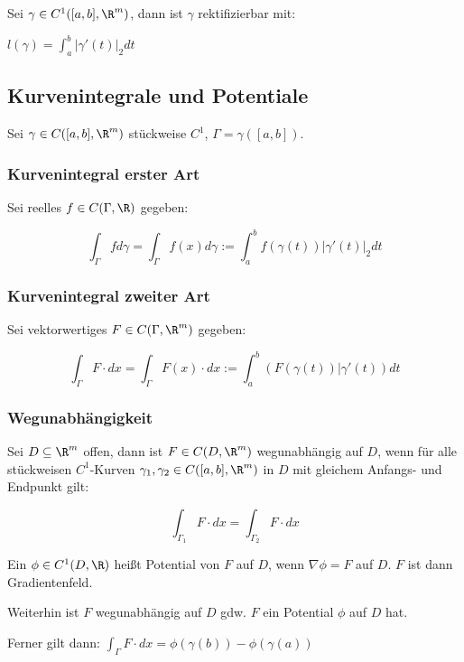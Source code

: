 Sei $\gamma \in C^1([a, b], \R^m)$, dann ist $\gamma$ rektifizierbar mit:

$l(\gamma) = \int_a^b |\gamma'(t)|_2 dt$

\subsection*{Kurvenintegrale und Potentiale}

Sei $\gamma \in C([a, b], \R^m)$ stückweise $C^1$, $\Gamma = \gamma([a, b])$.

\subsubsection*{Kurvenintegral erster Art}

Sei reelles $f \in C(\Gamma, \R)$ gegeben:

\vspace*{-5mm}
$$\int_\Gamma f d\gamma = \int_\Gamma f(x) d\gamma := \int_a^b f(\gamma(t)) | \gamma'(t) |_2 dt$$

\subsubsection*{Kurvenintegral zweiter Art}

Sei vektorwertiges $F \in C(\Gamma, \R^m)$ gegeben:

\vspace*{-5mm}
$$\int_\Gamma F \cdot dx = \int_\Gamma F(x) \cdot dx := \int_a^b (F(\gamma(t))|\gamma'(t)) dt$$

\subsubsection*{Wegunabhängigkeit}

Sei $D \subseteq \R^m$ offen, dann ist $F \in C(D, \R^m)$ wegunabhängig auf $D$, wenn für alle stückweisen $C^1$-Kurven $\gamma_1, \gamma_2 \in C([a, b], \R^m)$ in $D$ mit gleichem Anfangs- und Endpunkt gilt:

$$\int_{\Gamma_1} F \cdot dx = \int_{\Gamma_2} F \cdot dx$$

Ein $\phi \in C^1(D, \R)$ heißt Potential von $F$ auf $D$, wenn $\nabla\phi = F$ auf $D$. $F$ ist dann Gradientenfeld.

Weiterhin ist $F$ wegunabhängig auf $D$ gdw. $F$ ein Potential $\phi$ auf $D$ hat.

Ferner gilt dann: $\int_\Gamma F \cdot dx = \phi(\gamma(b))-\phi(\gamma(a))$

